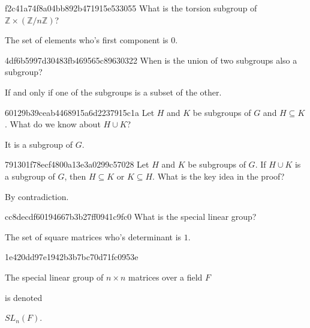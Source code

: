 \begin{note}{f2c41a74f8a04bb892b471915e533055}
    What is the torsion subgroup of \({ \mathbb Z \times (\mathbb Z / n\mathbb Z) }\)?

    \begin{cloze}{1}
        The set of elements who's first component is \({ 0 }\).
    \end{cloze}
\end{note}

\begin{note}{4df6b5997d30483fb469565c89630322}
    When is the union of two subgroups also a subgroup?

    \begin{cloze}{1}
        If and only if one of the subgroups is a subset of the other.
    \end{cloze}
\end{note}

\begin{note}{60129b39ceab4468915a6d2237915c1a}
    Let \({ H }\) and \({ K }\) be subgroups of \({ G }\) and \({ H \subseteq K }\).
    What do we know about \({ H \cup K }\)?

    \begin{cloze}{1}
        It is a subgroup of \({ G }\).
    \end{cloze}
\end{note}

\begin{note}{791301f78ecf4800a13e3a0299c57028}
    Let \({ H }\) and \({ K }\) be subgroups of \({ G }\).
    If \({ H \cup K }\) is a subgroup of \({ G }\), then \({ H \subseteq K }\) or \({ K \subseteq H }\).
    What is the key idea in the proof?

    \begin{cloze}{1}
        By contradiction.
    \end{cloze}
\end{note}

\begin{note}{cc8decdf60194667b3b27ff0941c9fc0}
    What is the special linear group?

    \begin{cloze}{1}
        The set of square matrices who's determinant is \({ 1 }\).
    \end{cloze}
\end{note}

\begin{note}{1e420dd97e1942b3b7bc70d71fc0953e}
    \begin{icloze}{2}The special linear group of \({ n \times n }\) matrices over a field \({ F }\)\end{icloze} is denoted \begin{icloze}{1}\({ SL_n(F) }\).\end{icloze}
\end{note}

